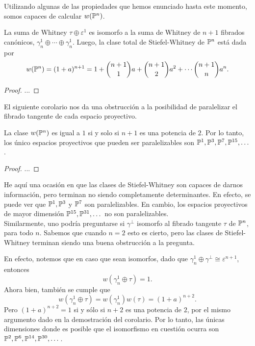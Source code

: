 Utilizando algunas de las propiedades que hemos enunciado hasta este momento, somos capaces de calcular $w(\P^{n})$.

\begin{theorem}\label{Clase del Tangente}
	La suma de Whitney $\tau \oplus \varepsilon^{1}$ es isomorfo a la suma de Whitney de $n+1$ fibrados canónicos, $\gamma_{n}^{1} \oplus \cdots \oplus \gamma_{n}^{1}$. Luego, la clase total de Stiefel-Whitney de $\P^{n}$ está dada por
	\[ w(\P^{n}) = (1 + a)^{n+1} = 1 + \binom{n+1}{1} a + \binom{n+1}{2} a^{2} + \cdots \binom{n+1}{n} a^{n}. \]
\end{theorem}
\begin{proof}
	...
\end{proof}

El siguiente corolario nos da una obstrucción a la posibilidad de paralelizar el fibrado tangente de cada espacio proyectivo.

\begin{corollary}
	La clase $w(\P^{n})$ es igual a $1$ si y solo si $n+1$ es una potencia de $2$. Por lo tanto, los único espacios proyectivos que pueden ser paralelizables son $\P^{1},\P^{3},\P^{7},\P^{15},\dots$.
\end{corollary}
\begin{proof}
	...
\end{proof}

He aquí una ocasión en que las clases de Stiefel-Whitney son capaces de darnos información, pero terminan no siendo completamente determinantes. En efecto, se puede ver que $\P^{1}, \P^{3}$ y $\P^{7}$ son paralelizables. En cambio, los espacios proyectivos de mayor dimensión $\P^{15},\P^{31},\dots$ no son paralelizables. \\[0.1pt]

Similarmente, uno podría preguntarse si $\gamma^{\perp}$ isomorfo al fibrado tangente $\tau$ de $\P^{n}$, para todo $n$. Sabemos que cuando $n = 2$ esto es cierto, pero las clases de Stiefel-Whitney terminan siendo una buena obstrucción a la pregunta. \par En efecto, notemos que en caso que sean isomorfos, dado que $\gamma_{n}^{1} \oplus \gamma^{\perp} \cong \varepsilon^{n+1}$, entonces
\[ w(\gamma_{n}^{1} \oplus \tau) = 1. \]
Ahora bien, también se cumple que
\[ w(\gamma_{n}^{1} \oplus \tau) = w(\gamma_{n}^{1}) w(\tau) = (1+a)^{n+2}. \]
Pero $(1+a)^{n+2} = 1$ si y sólo si $n+2$ es una potencia de $2$, por el mismo argumento dado en la demostración del corolario. Por lo tanto, las únicas dimensiones donde es posible que el isomorfismo en cuestión ocurra son $\P^{2},\P^{6},\P^{14},\P^{30},\dots$. \par


